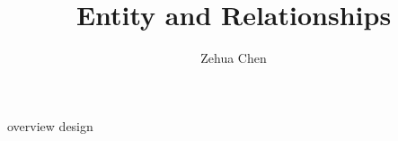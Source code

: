 \documentclass{../../../shared/latex/notes}
\title{Entity and Relationships}
\author{Zehua Chen}
\begin{document}
  \maketitle
  \tableofcontents

  {overview}
  {design}

  \newpage
  \printglossaries
\end{document}
